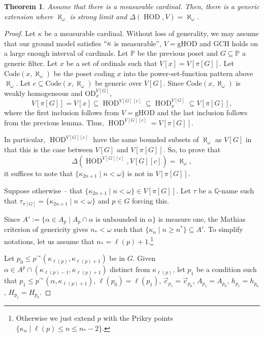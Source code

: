 \documentclass[11pt]{amsart}
\newtheorem{theorem}{Theorem}[section]
\theoremstyle{definition}
\theoremstyle{remark}
\newcommand\cat[1]{{}^\curvearrowright #1}
\DeclareMathOperator{\HOD}{HOD}
\def\s{\subseteq}
\begin{document}
\begin{theorem}\label{thm: Deltaequalsalephomega}
    Assume that there is a measurable cardinal. Then, there is a generic extension where $\aleph_\omega$ is strong limit  and $\Delta(\HOD, V)=\aleph_\omega$.
\end{theorem}
\begin{proof}
Let $\kappa$ be a measurable cardinal.
   Without loss of generality, we may assume that our ground model satisfies $``\kappa$ is measurable'', $V=\mathrm{gHOD}$ and  GCH holds on a large enough interval of cardinals. Let  $\mathbb{P}$ be the previous poset and  $G\s \mathbb{P}$ a generic filter. Let $x$ be a set of ordinals such that  $V[x]=V[\pi[G]]$. Let $\mathrm{Code}(x,\aleph_\omega)$ be the poset coding $x$ into the power-set-function pattern above $\aleph_\omega$. Let $c \s \mathrm{Code}(x,\aleph_\omega)$ be generic over $V[G]$. Since $\mathrm{Code}(x,\aleph_\omega)$ is weakly homogeneous and $\mathrm{OD}^{V[G]}_x$,
   $$V[\pi[G]]=V[x]\s \HOD^{V[G][c]} \s \HOD^{V[G]}_x\s V[\pi[G]],$$
  where the first inclusion follows from $V=\mathrm{gHOD}$ and the last inclusion follows from the previous lemma.  Thus, $\HOD^{V[G][c]}=V[\pi[G]]$.

  \smallskip
  
  In particular, $\HOD^{V[G][c]}$ have the same bounded subsets of $\aleph_\omega$ as $V[G]$ in that this is the case between $V[G]$ and $V[\pi[G]]$. So, to prove that $$\Delta(\HOD^{V[G][c]}, V[G][c])=\aleph_\omega,$$ it suffices to note that $\{\kappa_{2n+1}\mid n<\omega\}$ is not in $V[\pi[G]]$.

  \smallskip
  
    Suppose otherwise -- that $\{\kappa_{2n+1}\mid n<\omega\}\in V[\pi[G]]$. Let $\tau$ be a $\mathbb{Q}$-name such that $\tau_{\pi[G]}=\{\kappa_{2n+1}\mid n<\omega\}$ and $p\in G$  forcing this.

    Since $A':=\{\alpha\in A_p\mid \text{$A_p\cap \alpha$ is unbounded in $\alpha$}\}$ is measure one, the Mathias criterion of genericity gives  $n_*<\omega$ such that $\{\kappa_{n}\mid n\geq n^*\}\s A'$. To simplify notations, let us assume that $n_*=\ell(p)+1$.\footnote{Otherwise we just extend $p$ with the Prikry points $\{\kappa_n\mid \ell(p)\leq n\leq n_*-2\}$.}

  Let $p_0\leq p\cat  (\kappa_{\ell(p)}, \kappa_{\ell(p)+1})$ be in $G$. Given $\alpha\in A^p\cap (\kappa_{\ell(p)-1},\kappa_{\ell(p)+1})$ distinct from $\kappa_{\ell(p)}$, let $p_1$ be a condition such that  $p_1\leq p\cat  (\alpha, \kappa_{\ell(p)+1})$, $\ell(p_0)=\ell(p_1)$, $\vec{c}_{p_1}=\vec{c}_{p_0}$, $A_{p_1}=A_{p_0}$, $h_{p_1}=h_{p_0}$, $H_{p_1}=H_{p_0}$. 
  

\end{proof}
\end{document}
